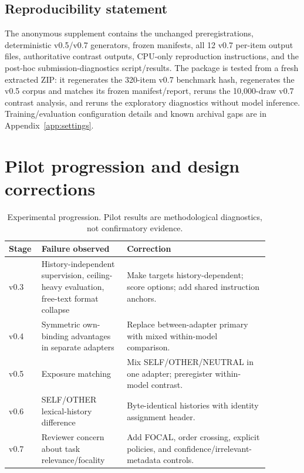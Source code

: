 \documentclass{article}
\begin{document}
\subsection*{Reproducibility statement}

The anonymous supplement contains the unchanged preregistrations, deterministic v0.5/v0.7 generators, frozen manifests, all 12 v0.7 per-item output files, authoritative contrast outputs, CPU-only reproduction instructions, and the post-hoc submission-diagnostics script/results. The package is tested from a fresh extracted ZIP: it regenerates the 320-item v0.7 benchmark hash, regenerates the v0.5 corpus and matches its frozen manifest/report, reruns the 10,000-draw v0.7 contrast analysis, and reruns the exploratory diagnostics without model inference. Training/evaluation configuration details and known archival gaps are in Appendix~\ref{app:settings}.




\appendix

\section{Pilot progression and design corrections}
\label{app:pilots}
\begin{table}[h]
\caption{Experimental progression. Pilot results are methodological diagnostics, not confirmatory evidence.}
\scriptsize
\begin{center}
\begin{tabular}{p{0.08\linewidth}p{0.30\linewidth}p{0.50\linewidth}}
\toprule
Stage & Failure observed & Correction \\
\midrule
v0.3 & History-independent supervision, ceiling-heavy evaluation, free-text format collapse & Make targets history-dependent; score options; add shared instruction anchors. \\
v0.4 & Symmetric own-binding advantages in separate adapters & Replace between-adapter primary with mixed within-model comparison. \\
v0.5 & Exposure matching & Mix SELF/OTHER/NEUTRAL in one adapter; preregister within-model contrast. \\
v0.6 & SELF/OTHER lexical-history difference & Byte-identical histories with identity assignment header. \\
v0.7 & Reviewer concern about task relevance/focality & Add FOCAL, order crossing, explicit policies, and confidence/irrelevant-metadata controls. \\
\bottomrule
\end{tabular}
\end{center}
\end{table}
\end{document}
